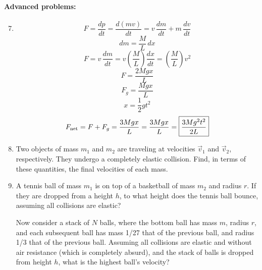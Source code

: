 \documentclass[12pt,letterpaper]{article}
\begin{document}
\begin{multicols}{2}
\paragraph{Advanced problems:}
\begin{enumerate}
\setcounter{enumi}{6}
\item
$$F = \frac{dp}{dt} = \frac{d\left(mv\right)}{dt} = v\,\frac{dm}{dt} + m\,\frac{dv}{dt}$$
$$dm = \frac{M}{L}\,dx$$
$$F = v\,\frac{dm}{dt}=v\left(\frac{M}{L}\right)\frac{dx}{dt} = \left(\frac{M}{L}\right)v^2$$
$$F = \frac{2Mgx}{L}$$
$$F_g = \frac{Mgx}{L}$$
$$x = \frac{1}{2}gt^2$$
$$F_{\text{net}} = F + F_g = \frac{3Mgx}{L} = \frac{3Mgx}{L} = \fbox{$\displaystyle \frac{3Mg^2t^2}{2L}$}$$


\item
Two objects of mass $m_1$ and $m_2$ are traveling at velocities $\vec{v}_1$ and $\vec{v}_2$, respectively. They undergo a completely elastic collision. Find, in terms of these quantities, the final velocities of each mass.

\item
A tennis ball of mass $m_1$ is on top of a basketball of mass $m_2$ and radius $r$. If they are dropped from a height $h$, to what height does the tennis ball bounce, assuming all collisions are elastic?

Now consider a stack of $N$ balls, where the bottom ball has mass $m$, radius $r$, and each subsequent ball has mass 1/27 that of the previous ball, and radius 1/3 that of the previous ball. Assuming all collisions are elastic and without air resistance (which is completely absurd), and the stack of balls is dropped from height $h$, what is the highest ball's velocity?

\end{enumerate}
\end{multicols}
\end{document}
